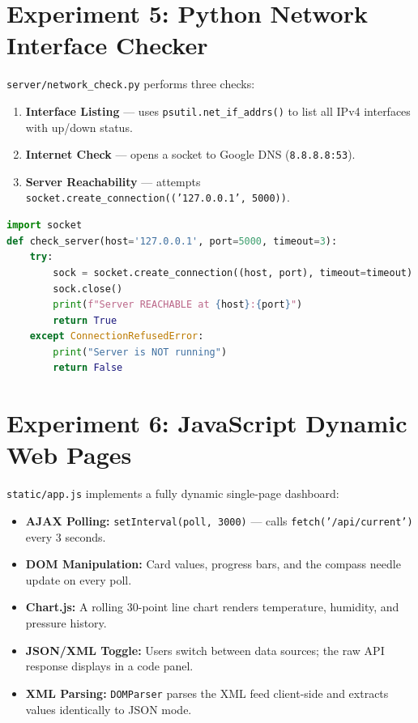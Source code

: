 \documentclass[12pt,a4paper]{article}
\begin{document}
\section{Experiment 5: Python Network Interface Checker}

\texttt{server/network\_check.py} performs three checks:

\begin{enumerate}
  \item \textbf{Interface Listing} — uses \texttt{psutil.net\_if\_addrs()} to list all IPv4 interfaces with up/down status.
  \item \textbf{Internet Check} — opens a socket to Google DNS (\texttt{8.8.8.8:53}).
  \item \textbf{Server Reachability} — attempts \texttt{socket.create\_connection(('127.0.0.1', 5000))}.
\end{enumerate}

\begin{lstlisting}[language=Python, caption=Socket-based server reachability check]
import socket
def check_server(host='127.0.0.1', port=5000, timeout=3):
    try:
        sock = socket.create_connection((host, port), timeout=timeout)
        sock.close()
        print(f"Server REACHABLE at {host}:{port}")
        return True
    except ConnectionRefusedError:
        print("Server is NOT running")
        return False
\end{lstlisting}

\section{Experiment 6: JavaScript Dynamic Web Pages}

\texttt{static/app.js} implements a fully dynamic single-page dashboard:

\begin{itemize}
  \item \textbf{AJAX Polling:} \texttt{setInterval(poll, 3000)} — calls \texttt{fetch('/api/current')} every 3 seconds.
  \item \textbf{DOM Manipulation:} Card values, progress bars, and the compass needle update on every poll.
  \item \textbf{Chart.js:} A rolling 30-point line chart renders temperature, humidity, and pressure history.
  \item \textbf{JSON/XML Toggle:} Users switch between data sources; the raw API response displays in a code panel.
  \item \textbf{XML Parsing:} \texttt{DOMParser} parses the XML feed client-side and extracts values identically to JSON mode.
\end{itemize}
\end{document}
